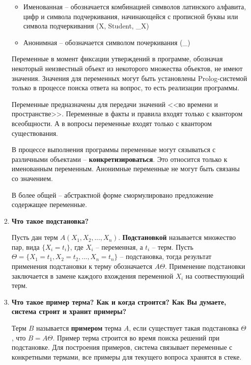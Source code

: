 \begin{enumerate}
\begin{itemize}
    \item Именованная -- обозначается комбинацией символов латинского алфавита, цифр и символа подчеркивания, начинающейся с прописной буквы или символа подчеркивания (X, Student, \_X)
    \item Анонимная -- обозначается символом почеркивания (\_)
\end{itemize}

Переменные в момент фиксации утверждений в программе, обозначая некоторый неизвестный объект из некоторого множества объектов, не имеют значения. Значения для переменных могут быть установлены Prolog-системой только в процессе поиска ответа на вопрос, то есть реализации программы.

Переменные предназначены для передачи значений <<во времени и пространстве>>. Переменные в факты и правила входят только с квантором всеобщности. А в вопросы переменные входят только с квантором существования.

В процессе выполнения программы переменные могут сязываться с различными объектами -- \textbf{конкретизироваться}. Это относится только к именованным переменным. Анонимные переменные не могут быть связаны со значением.

В более общей -- абстрактной форме смормулировано предложение содержащее переменные.

    \item \textbf{Что такое подстановка?}

        Пусть дан терм $A(X_1, X_2, ..., X_n)$. \textbf{Подстановкой} называется множество пар, вида $\{X_i = t_i\}$, где $X_i$ -- переменная, а $t_i$ -- терм. Пусть $\Theta = \{ X_1 = t_1, X_2 = t_2, ..., X_n = t_n \}$ -- подстановка, тогда результат применения подстановки к терму обозначается $A\Theta$. Применение подстановки заключается в замене каждого вхождения переменной $X_i$ на соотвествующий терм.

    \item \textbf{Что такое пример терма? Как и когда строится? Как Вы думаете, система строит и хранит примеры?}

        Терм $B$ называется \textbf{примером} терма $A$, если существует такая подстановка $\Theta$, что $B = A\Theta$. Пример терма строится во время поиска решений при подстановке. Для построения примеров, система связывает переменные с конкретными термами, все примеры для текущего вопроса хранятся в стеке.
\end{enumerate}
